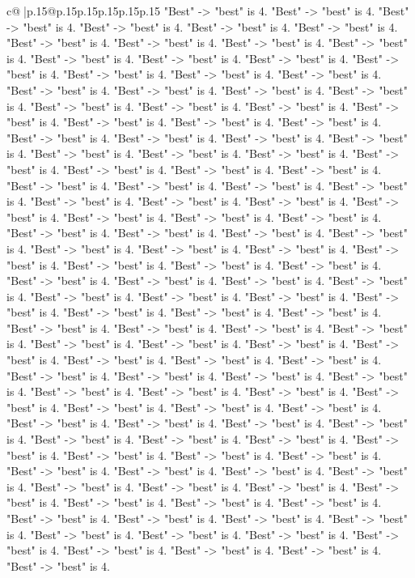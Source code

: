 \documentclass{article}
\begin{document}
{\begin{supertabular}{c@{$\;$}|p{.15\linewidth}@{}p{.15\linewidth}p{.15\linewidth}p{.15\linewidth}p{.15\linewidth}p{.15\linewidth}}
{{{"Best" {-}> "best" is 4. "Best" {-}> "best" is 4. "Best" {-}> "best" is 4. "Best" {-}> "best" is 4. "Best" {-}> "best" is 4. "Best" {-}> "best" is 4. "Best" {-}> "best" is 4. "Best" {-}> "best" is 4. "Best" {-}> "best" is 4. "Best" {-}> "best" is 4. "Best" {-}> "best" is 4. "Best" {-}> "best" is 4. "Best" {-}> "best" is 4. "Best" {-}> "best" is 4. "Best" {-}> "best" is 4. "Best" {-}> "best" is 4. "Best" {-}> "best" is 4. "Best" {-}> "best" is 4. "Best" {-}> "best" is 4. "Best" {-}> "best" is 4. "Best" {-}> "best" is 4. "Best" {-}> "best" is 4. "Best" {-}> "best" is 4. "Best" {-}> "best" is 4. "Best" {-}> "best" is 4. "Best" {-}> "best" is 4. "Best" {-}> "best" is 4. "Best" {-}> "best" is 4. "Best" {-}> "best" is 4. "Best" {-}> "best" is 4. "Best" {-}> "best" is 4. "Best" {-}> "best" is 4. "Best" {-}> "best" is 4. "Best" {-}> "best" is 4. "Best" {-}> "best" is 4. "Best" {-}> "best" is 4. "Best" {-}> "best" is 4. "Best" {-}> "best" is 4. "Best" {-}> "best" is 4. "Best" {-}> "best" is 4. "Best" {-}> "best" is 4. "Best" {-}> "best" is 4. "Best" {-}> "best" is 4. "Best" {-}> "best" is 4. "Best" {-}> "best" is 4. "Best" {-}> "best" is 4. "Best" {-}> "best" is 4. "Best" {-}> "best" is 4. "Best" {-}> "best" is 4. "Best" {-}> "best" is 4. "Best" {-}> "best" is 4. "Best" {-}> "best" is 4. "Best" {-}> "best" is 4. "Best" {-}> "best" is 4. "Best" {-}> "best" is 4. "Best" {-}> "best" is 4. "Best" {-}> "best" is 4. "Best" {-}> "best" is 4. "Best" {-}> "best" is 4. "Best" {-}> "best" is 4. "Best" {-}> "best" is 4. "Best" {-}> "best" is 4. "Best" {-}> "best" is 4. "Best" {-}> "best" is 4. "Best" {-}> "best" is 4. "Best" {-}> "best" is 4. "Best" {-}> "best" is 4. "Best" {-}> "best" is 4. "Best" {-}> "best" is 4. "Best" {-}> "best" is 4. "Best" {-}> "best" is 4. "Best" {-}> "best" is 4. "Best" {-}> "best" is 4. "Best" {-}> "best" is 4. "Best" {-}> "best" is 4. "Best" {-}> "best" is 4. "Best" {-}> "best" is 4. "Best" {-}> "best" is 4. "Best" {-}> "best" is 4. "Best" {-}> "best" is 4. "Best" {-}> "best" is 4. "Best" {-}> "best" is 4. "Best" {-}> "best" is 4. "Best" {-}> "best" is 4. "Best" {-}> "best" is 4. "Best" {-}> "best" is 4. "Best" {-}> "best" is 4. "Best" {-}> "best" is 4. "Best" {-}> "best" is 4. "Best" {-}> "best" is 4. "Best" {-}> "best" is 4. "Best" {-}> "best" is 4. "Best" {-}> "best" is 4. "Best" {-}> "best" is 4. "Best" {-}> "best" is 4. "Best" {-}> "best" is 4. "Best" {-}> "best" is 4. "Best" {-}> "best" is 4. "Best" {-}> "best" is 4. "Best" {-}> "best" is 4. "Best" {-}> "best" is 4. "Best" {-}> "best" is 4. "Best" {-}> "best" is 4. "Best" {-}> "best" is 4. "Best" {-}> "best" is 4. "Best" {-}> "best" is 4. "Best" {-}> "best" is 4. "Best" {-}> "best" is 4. "Best" {-}> "best" is 4. "Best" {-}> "best" is 4. "Best" {-}> "best" is 4. "Best" {-}> "best" is 4. "Best" {-}> "best" is 4. "Best" {-}> "best" is 4. "Best" {-}> "best" is 4. "Best" {-}> "best" is 4. "Best" {-}> "best" is 4. "Best" {-}> "best" is 4. "Best" {-}> "best" is 4. "Best" {-}> "best" is 4. "Best" {-}> "best" is 4. "Best" {-}> "best" is 4. "Best" {-}> "best" is 4. "Best" {-}> "best" is 4. "Best" {-}> "best" is 4. "Best" {-}> "best" is 4. "Best" {-}> "best" is 4. "Best" {-}> "best" is 4. }}}
\end{supertabular}}
\end{document}
